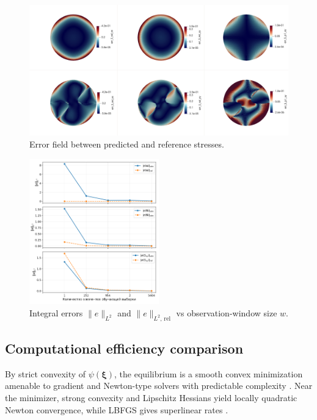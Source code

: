   
  \begin{figure}[H]
    \centering
    \includegraphics[width=1.0\textwidth]{../img/Numerical/errs.png}
    \caption{Error field between predicted and reference stresses.}
    \label{fig:numerical_errors}
  \end{figure}

  \begin{figure}[H]
    \centering
    \includegraphics[width=0.5\textwidth]{../img/integral_errors.png}
    \caption{Integral errors $\|e\|_{L^2}$ and $\|e\|_{L^2,\,\mathrm{rel}}$ vs observation-window size $w$.}
    \label{fig:integral_errors}
  \end{figure}
  
  
\subsection{Computational efficiency comparison}

  By strict convexity of $\psi(\boldsymbol\xi)$, the equilibrium is a smooth convex minimization amenable to gradient and Newton-type solvers with predictable complexity \cite{BoydVandenberghe2004,Nesterov2004,NocedalWright2006,ConnGouldToint2000}. Near the minimizer, strong convexity and Lipschitz Hessians yield locally quadratic Newton convergence, while L\textendash BFGS gives superlinear rates \cite{NocedalWright2006}.

